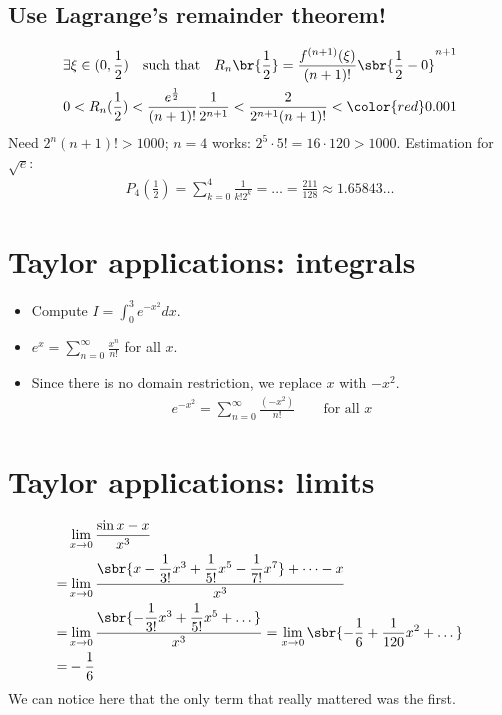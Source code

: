     \subsection*{Use Lagrange's remainder theorem!}
    \begin{align*}
\exists \xi \in (0, \frac{1}{2}) \quad \text{such that} \quad R_{n} \br{\frac{1}{2}} = \frac{f^{(n+1)} (\xi)}{(n+1)!} \sbr{\frac{1}{2} - 0}^{n+1} \\
0 < R_n(\frac{1}{2}) < \frac{  e ^{\frac{1}{2}}  }{(n+1)!} \frac{1}{2 ^{n+1} } < \frac{2}{2 ^{n+1} (n+1) !} < {\color{red} 0.001}
    \end{align*}
Need \(2 ^{n} (n + 1) ! > 1000\); \(n = 4\) works: \(2^5 \cdot 5! = 16 \cdot 120 > 1000\).
Estimation for \(\sqrt{e}\): \begin{align*}
P_4 (\frac{1}{2}) = \sum_{k = 0}^{4} \frac{1}{k! 2^k} = \dots = \frac{211}{128} \approx 1.65843\dots
\end{align*}



\newpage
\section{Taylor applications: integrals}
\begin{itemize}
    \item Compute \(I = \int_{0}^{3} {e^{-x^2}} dx \).
    \item \(e^x = \sum_{n = 0}^{\infty} \frac{x^n}{n!}\) for all \(x\).
    \item Since there is no domain restriction, we replace \(x\) with \(-x^2\). \begin{align*}
        e^{-x^2} = \sum_{n = 0}^{\infty} \frac{(-x^2)}{n!} \qquad \text{for all } x
    \end{align*}
\end{itemize}
\newpage
\section{Taylor applications: limits}
\begin{align*}
 & \lim_{x\to 0} \dfrac{\sin x - x}{x^3}\\
=& \lim_{x\to 0} \dfrac{\sbr{x - \dfrac{1}{3!}x^3 + \dfrac{1}{5!} x^5 - \dfrac{1}{7!}x^7}+ \dots - x}{x^3} \\
=& \lim_{x\to 0} \dfrac{\sbr{-\dfrac{1}{3!}x^3 + \dfrac{1}{5!}x^5 + \dots}}{x^3} = \lim_{x\to 0} \sbr{-\dfrac{1}{6}+ \dfrac{1}{120}x^2+ \dots} \\
=& - \dfrac{1}{6}
\end{align*}
We can notice here that the only term that really mattered was the first.

